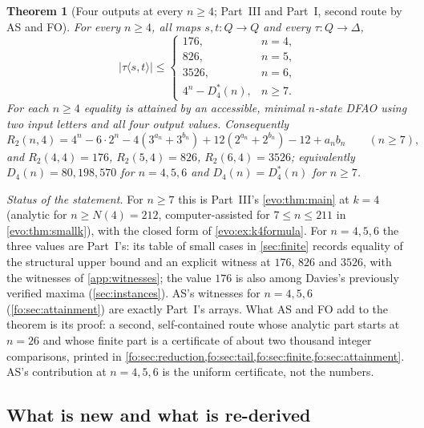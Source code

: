 \documentclass[11pt,a4paper]{article}
\numberwithin{equation}{section}
\newtheorem{theorem}{Theorem}[section]
\theoremstyle{definition}
\theoremstyle{remark}
\newcommand{\D}{\Delta}
\begin{document}
\begin{theorem}[Four outputs at every $n\ge4$; Part~III and Part~I, second route by AS and FO]\label{fo:thm:main}
For every $n\ge4$, all maps $s,t:Q\to Q$ and every $\tau:Q\to\D$,
\begin{equation}\label{fo:eq:upper}
 |\tau\langle s,t\rangle|\le
 \begin{cases}
 176,&n=4,\\
 826,&n=5,\\
 3526,&n=6,\\
 4^n-D^*_4(n),&n\ge7.
 \end{cases}
\end{equation}
For each $n\ge4$ equality is attained by an accessible, minimal $n$-state
DFAO using two input letters and all four output values. Consequently
\begin{equation}\label{fo:eq:main}
 R_2(n,4)=4^n-6\cdot2^n-4(3^{a_n}+3^{b_n})+12(2^{a_n}+2^{b_n})-12+a_nb_n
 \qquad(n\ge7),
\end{equation}
and $R_2(4,4)=176$, $R_2(5,4)=826$, $R_2(6,4)=3526$; equivalently
$D_4(n)=80,198,570$ for $n=4,5,6$ and $D_4(n)=D^*_4(n)$ for $n\ge7$.
\end{theorem}

\emph{Status of the statement.} For $n\ge7$ this is Part~III's
\cref{evo:thm:main} at $k=4$ (analytic for $n\ge N(4)=212$,
computer-assisted for $7\le n\le211$ in \cref{evo:thm:smallk}), with the
closed form of \cref{evo:ex:k4formula}. For $n=4,5,6$ the three values are
Part~I's: its table of small cases in \cref{sec:finite} records equality of
the structural upper bound and an explicit witness at $176$, $826$ and
$3526$, with the witnesses of \cref{app:witnesses}; the value $176$ is also
among Davies's previously verified maxima (\cref{sec:instances}). AS's
witnesses for $n=4,5,6$ (\cref{fo:sec:attainment}) are exactly Part~I's arrays.
What AS and FO add to the theorem is its proof: a second, self-contained route
whose analytic part starts at $n=26$ and whose finite part is a certificate of
about two thousand integer comparisons, printed in
\cref{fo:sec:reduction,fo:sec:tail,fo:sec:finite,fo:sec:attainment}. AS's
contribution at $n=4,5,6$ is the uniform certificate, not the numbers.

\subsection{What is new and what is re-derived}\label{fo:sec:new}
\end{document}
